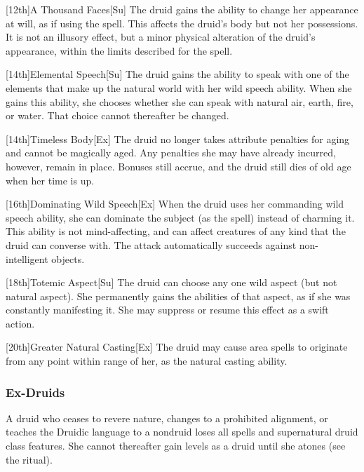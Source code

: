 [12th]{A Thousand Faces}[Su] The druid gains the ability to change her appearance at will, as if using the 
spell.
This affects the druid's body but not her possessions.
It is not an illusory effect, but a minor physical alteration of the druid's appearance, within the limits described for the spell.

[14th]{Elemental Speech}[Su]
The druid gains the ability to speak with one of the elements that make up the natural world with her wild speech ability.
When she gains this ability, she chooses whether she can speak with natural air, earth, fire, or water.
That choice cannot thereafter be changed.

[14th]{Timeless Body}[Ex]
The druid no longer takes attribute penalties for aging and cannot be magically aged.
Any penalties she may have already incurred, however, remain in place.
Bonuses still accrue, and the druid still dies of old age when her time is up.

[16th]{Dominating Wild Speech}[Ex]
When the druid uses her commanding wild speech ability, she can dominate the subject (as the 
spell) instead of charming it.
This ability is not mind-affecting, and can affect creatures of any kind that the druid can converse with.
The attack automatically succeeds against non-intelligent objects.

[18th]{Totemic Aspect}[Su]
The druid can choose any one wild aspect (but not natural aspect).
She permanently gains the abilities of that aspect, as if she was constantly manifesting it.
She may suppress or resume this effect as a swift action.

[20th]{Greater Natural Casting}[Ex]
The druid may cause area spells to originate from any point within \rngmed range of her, as the natural casting ability.

\subsubsection{Ex-Druids}
A druid who ceases to revere nature, changes to a prohibited alignment, or teaches the Druidic language to a nondruid loses all spells and supernatural druid class features.
She cannot thereafter gain levels as a druid until she atones (see the  ritual).

